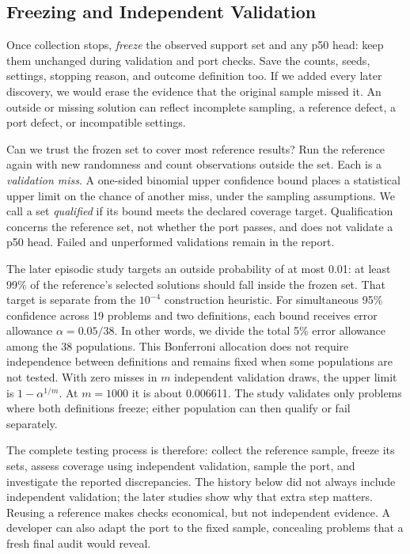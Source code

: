 \documentclass[10pt,letterpaper]{article}
\begin{document}
\subsection{Freezing and Independent Validation}\label{sec:qualification}

Once collection stops, \emph{freeze} the observed support set and any p50 head: keep them
unchanged during validation and port checks. Save the counts, seeds, settings, stopping
reason, and outcome definition too. If we added every later discovery, we would erase the
evidence that the original sample missed it. An outside or missing solution can reflect
incomplete sampling, a reference defect, a port defect, or incompatible settings.

Can we trust the frozen set to cover most reference results? Run the reference again with
new randomness and count observations outside the set. Each is a \emph{validation miss}. A
one-sided binomial upper confidence bound places a statistical upper limit on the chance
of another miss, under the sampling assumptions. We call a set \emph{qualified} if its
bound meets the declared coverage target. Qualification concerns the reference set, not
whether the port passes, and does not validate a p50 head. Failed and unperformed
validations remain in the report.

The later episodic study targets an outside probability of at most 0.01: at least 99\% of
the reference's selected solutions should fall inside the frozen set. That target is
separate from the \(10^{-4}\) construction heuristic. For simultaneous 95\% confidence
across 19 problems and two definitions, each bound receives error allowance
\(\alpha=0.05/38\). In other words, we divide the total 5\% error allowance among the 38
populations. This Bonferroni allocation does not require independence between definitions
and remains fixed when some populations are not tested. With zero misses in \(m\)
independent validation draws, the upper limit is \(1-\alpha^{1/m}\). At \(m=1000\) it is
about 0.006611. The study validates only problems where both definitions freeze; either
population can then qualify or fail separately.

The complete testing process is therefore: collect the reference sample, freeze its sets,
assess coverage using independent validation, sample the port, and investigate the
reported discrepancies. The history below did not always include independent validation;
the later studies show why that extra step matters. Reusing a reference makes checks
economical, but not independent evidence. A developer can also adapt the port to the fixed
sample, concealing problems that a fresh final audit would reveal.
\end{document}
